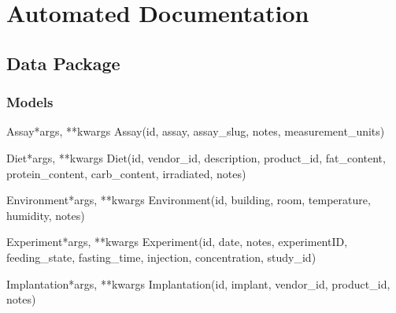 \documentclass[letterpaper,10pt,english]{sphinxmanual}
\begin{document}
\resetcurrentobjects
\hypertarget{--doc-api}{}

\chapter{Automated Documentation}


\section{Data Package}
\hypertarget{module-data}{}
\modulesynopsis{}

\subsection{Models}
\hypertarget{module-data.models}{}
\modulesynopsis{}

\hypertarget{data.models.Assay}{}\begin{classdesc}{Assay}{*args, **kwargs}
Assay(id, assay, assay\_slug, notes, measurement\_units)
\end{classdesc}

\hypertarget{data.models.Diet}{}\begin{classdesc}{Diet}{*args, **kwargs}
Diet(id, vendor\_id, description, product\_id, fat\_content, protein\_content, carb\_content, irradiated, notes)
\end{classdesc}

\hypertarget{data.models.Environment}{}\begin{classdesc}{Environment}{*args, **kwargs}
Environment(id, building, room, temperature, humidity, notes)
\end{classdesc}

\hypertarget{data.models.Experiment}{}\begin{classdesc}{Experiment}{*args, **kwargs}
Experiment(id, date, notes, experimentID, feeding\_state, fasting\_time, injection, concentration, study\_id)
\end{classdesc}

\hypertarget{data.models.Implantation}{}\begin{classdesc}{Implantation}{*args, **kwargs}
Implantation(id, implant, vendor\_id, product\_id, notes)
\end{classdesc}
\end{document}
